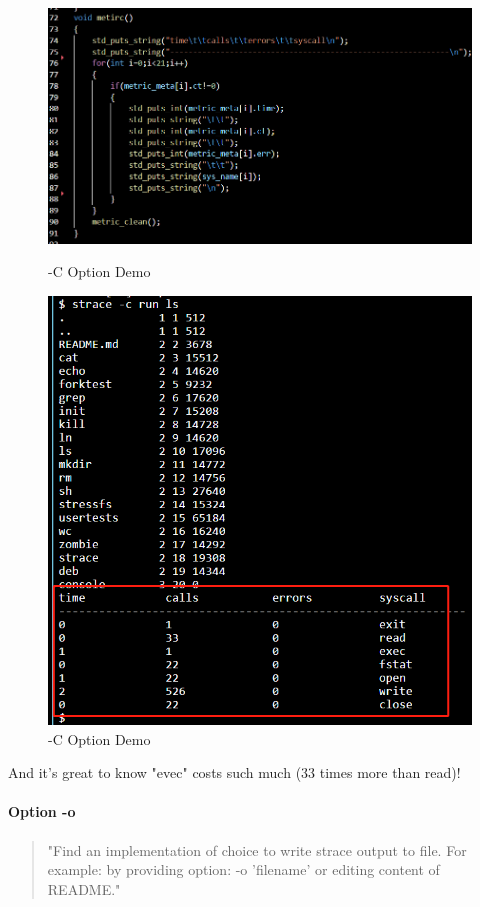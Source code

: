 \documentclass[11pt,oneside,a4paper]{article}
\begin{document}
\begin{figure}[H]
    \includegraphics[width=4.75in]{1-31.png}
    \centering
    \caption{-C Option Demo}
    \includegraphics[width=4.75in]{1-32.png}
    \centering
    \caption{-C Option Demo}
\end{figure}
And it's great to know "evec" costs such much (33 times more than read)!

\paragraph*{Option -o}
\begin{quotation}
    "Find an implementation of choice to write strace output to file.
    For example: by providing option: -o 'filename' or editing content of README."
\end{quotation}
\end{document}
